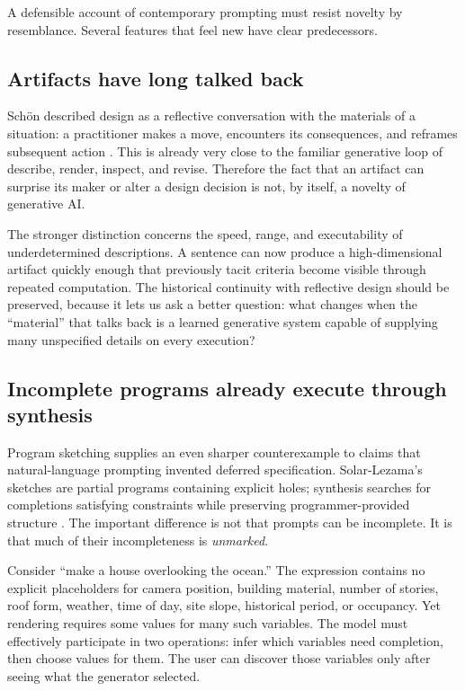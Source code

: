 \documentclass[11pt]{article}
\begin{document}
A defensible account of contemporary prompting must resist novelty by resemblance. Several features that feel new have clear predecessors.

\subsection{Artifacts have long talked back}

Schön described design as a reflective conversation with the materials of a situation: a practitioner makes a move, encounters its consequences, and reframes subsequent action \cite{schon1992designing}. This is already very close to the familiar generative loop of describe, render, inspect, and revise. Therefore the fact that an artifact can surprise its maker or alter a design decision is not, by itself, a novelty of generative AI.

The stronger distinction concerns the speed, range, and executability of underdetermined descriptions. A sentence can now produce a high-dimensional artifact quickly enough that previously tacit criteria become visible through repeated computation. The historical continuity with reflective design should be preserved, because it lets us ask a better question: what changes when the ``material'' that talks back is a learned generative system capable of supplying many unspecified details on every execution?

\subsection{Incomplete programs already execute through synthesis}

Program sketching supplies an even sharper counterexample to claims that natural-language prompting invented deferred specification. Solar-Lezama's sketches are partial programs containing explicit holes; synthesis searches for completions satisfying constraints while preserving programmer-provided structure \cite{solarlezama2008program}. The important difference is not that prompts can be incomplete. It is that much of their incompleteness is \emph{unmarked}.

Consider ``make a house overlooking the ocean.'' The expression contains no explicit placeholders for camera position, building material, number of stories, roof form, weather, time of day, site slope, historical period, or occupancy. Yet rendering requires some values for many such variables. The model must effectively participate in two operations: infer which variables need completion, then choose values for them. The user can discover those variables only after seeing what the generator selected.
\end{document}
